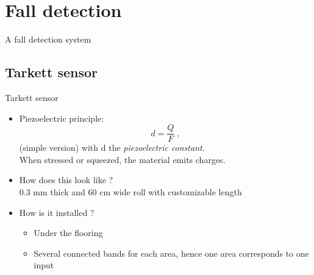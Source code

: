 \section{Fall detection}

\begingroup
{}  %
\begin{frame}[noframenumbering]{}
    \centering
    \vspace{3cm}
    \Huge
    \textcolor{myblue}{A fall detection system}
\end{frame}
\endgroup

\subsection{Tarkett sensor}
\begin{frame}{Tarkett sensor}
\begin{minipage}[t]{0.35\linewidth}
    \vspace{0pt}
    \begin{itemize}
        \item Piezoelectric principle: $$d = \frac{Q}{F}\;,$$ (simple version) with d the \emph{piezoelectric constant}.\\
        When stressed or squeezed, the material emits charges.\\
        \pause
        \item How does this look like ?\\
            0.3 mm thick and 60 cm wide roll with customizable length
        \pause
        \item How is it installed ?\\
            \begin{itemize}
                \item Under the flooring
                \item Several connected bands for each area, hence one area corresponds to one input
            \end{itemize}


\end{itemize}
\end{minipage}
\end{frame}
